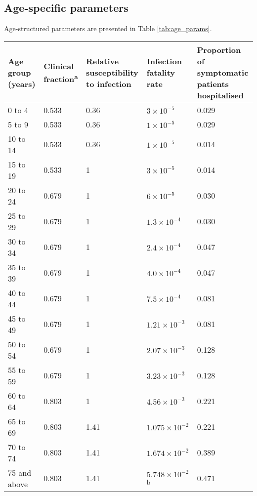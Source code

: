 \subsection{Age-specific parameters}

Age-structured parameters are presented in Table \ref{tab:age_params}.

\begin{table}[h]
    \begin{tabular}[h]{| p{2cm} | p{2.5cm} | p{3cm} | p{3cm} | p{2.5cm}|}
    \hline
        Age group (years) & 
        Clinical fraction\textsuperscript{a} & 
        Relative susceptibility to infection & 
        Infection fatality rate & 
        Proportion of symptomatic patients hospitalised \\
        \hline
        0 to 4 & 0.533 & 0.36 & $3\times10^{-5}$ & 0.029 \\
        \hline
        5 to 9 & 0.533 & 0.36 & $1\times10^{-5}$ & 0.029 \\
        \hline
        10 to 14 & 0.533 & 0.36 & $1\times10^{-5}$ & 0.014 \\
        \hline
        15 to 19 & 0.533 & 1 & $3\times10^{-5}$ & 0.014 \\
        \hline
        20 to 24 & 0.679 & 1 & $6\times10^{-5}$ & 0.030 \\
        \hline
        25 to 29 & 0.679 & 1 & $1.3\times10^{-4}$ & 0.030 \\
        \hline
        30 to 34 & 0.679 & 1 & $2.4\times10^{-4}$ & 0.047 \\
        \hline
        35 to 39 & 0.679 & 1 & $4.0\times10^{-4}$ & 0.047 \\
        \hline
        40 to 44 & 0.679 & 1 & $7.5\times10^{-4}$ & 0.081 \\
        \hline
        45 to 49 & 0.679 & 1 & $1.21\times10^{-3}$ & 0.081 \\
        \hline
        50 to 54 & 0.679 & 1 & $2.07\times10^{-3}$ & 0.128 \\
        \hline
        55 to 59 & 0.679 & 1 & $3.23\times10^{-3}$ & 0.128 \\
        \hline
        60 to 64 & 0.803 & 1 & $4.56\times10^{-3}$ & 0.221 \\
        \hline
        65 to 69 & 0.803 & 1.41 & $1.075\times10^{-2}$ & 0.221 \\
        \hline
        70 to 74 & 0.803 & 1.41 & $1.674\times10^{-2}$ & 0.389 \\
        \hline
        75 and above & 0.803 & 1.41 & $5.748\times10^{-2}$ \textsuperscript{b} & 0.471 \\

\end{tabular}
\end{table}
